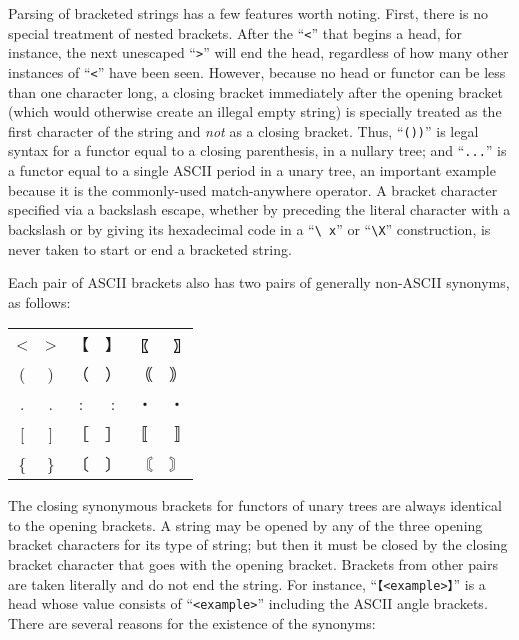 \documentclass[twocolumn]{report}
\begin{document}
Parsing of bracketed strings has a few features worth noting.  First, there
is no special treatment of nested brackets.  After the ``\texttt{<}'' that
begins a head, for instance, the next unescaped ``\texttt{>}'' will end the
head, regardless of how many other instances of ``\texttt{<}'' have been
seen.  However, because no head or functor can be less than one character
long, a closing bracket immediately after the opening bracket (which would
otherwise create an illegal empty string) is specially treated as the first
character of the string and \emph{not} as a closing bracket.  Thus,
``\texttt{())}'' is legal syntax for a functor equal to a closing
parenthesis, in a nullary tree; and ``\texttt{...}'' is a functor equal to a
single ASCII period in a unary tree, an important example because it is the
commonly-used match-anywhere operator.  A bracket character specified via a
backslash escape, whether by preceding the literal character with a
backslash or by giving its hexadecimal code in a ``\texttt{\textbackslash
x}'' or ``\texttt{\textbackslash X}'' construction, is never taken to start
or end a bracketed string.

Each pair of ASCII brackets also has two pairs of generally
non-ASCII synonyms, as
follows:

{\ttfamily\hspace*{\fill}
\begin{tabular}{cccccc}
  <&>&【&】&〖&〗\\
  (&)&（&）&｟&｠\\
  .&.&:&:&・&・\\\relax
  [&]&［&］&〚&〛\\
  \{&\}&〔&〕&〘&〙
\end{tabular}
\hspace*{\fill}\par}

The closing synonymous brackets for functors of unary trees are always
identical to the opening brackets.  A string may be opened by any of the
three opening bracket characters for its type of string; but then it must be
closed by the closing bracket character that goes with the opening bracket. 
Brackets from other pairs are taken literally and do not end the string.
For instance,
``\texttt{【<example>】}'' is a head whose value consists of
``\texttt{<example>}'' including the ASCII angle brackets.  There are
several reasons for the existence of the synonyms:
\end{document}
